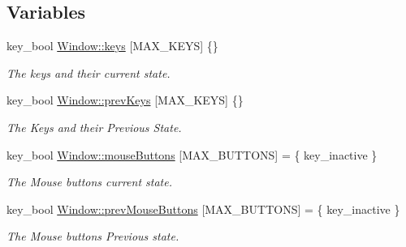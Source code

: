 \subsection*{Variables}
\begin{DoxyCompactItemize}
\item 
\mbox{\label{group___getters_ga7e9389c2d0e9f90f10422f86be7d22d8}} 
key\+\_\+bool \mbox{\hyperlink{group___getters_ga7e9389c2d0e9f90f10422f86be7d22d8}{Window\+::keys}} \mbox{[}M\+A\+X\+\_\+\+K\+E\+YS\mbox{]} \{\}
\begin{DoxyCompactList}\small\item\em The keys and their current state. \end{DoxyCompactList}\item 
\mbox{\label{group___getters_gaa0adc9c4e183ccaa355928059359fe9a}} 
key\+\_\+bool \mbox{\hyperlink{group___getters_gaa0adc9c4e183ccaa355928059359fe9a}{Window\+::prev\+Keys}} \mbox{[}M\+A\+X\+\_\+\+K\+E\+YS\mbox{]} \{\}
\begin{DoxyCompactList}\small\item\em The Keys and their Previous State. \end{DoxyCompactList}\item 
\mbox{\label{group___getters_gaf219ad727d87f6f2d0d34c0d165ec065}} 
key\+\_\+bool \mbox{\hyperlink{group___getters_gaf219ad727d87f6f2d0d34c0d165ec065}{Window\+::mouse\+Buttons}} \mbox{[}M\+A\+X\+\_\+\+B\+U\+T\+T\+O\+NS\mbox{]} = \{ key\+\_\+inactive \}
\begin{DoxyCompactList}\small\item\em The Mouse buttons current state. \end{DoxyCompactList}\item 
\mbox{\label{group___getters_ga89e8b6c9ffa84a095ec76cf1b29b5f94}} 
key\+\_\+bool \mbox{\hyperlink{group___getters_ga89e8b6c9ffa84a095ec76cf1b29b5f94}{Window\+::prev\+Mouse\+Buttons}} \mbox{[}M\+A\+X\+\_\+\+B\+U\+T\+T\+O\+NS\mbox{]} = \{ key\+\_\+inactive \}
\begin{DoxyCompactList}\small\item\em The Mouse buttons Previous state. \end{DoxyCompactList}\item 
\mbox{\label{group___getters_gad50401a5c3c350b562b9577106e60fb0}} 

\end{DoxyCompactItemize}
